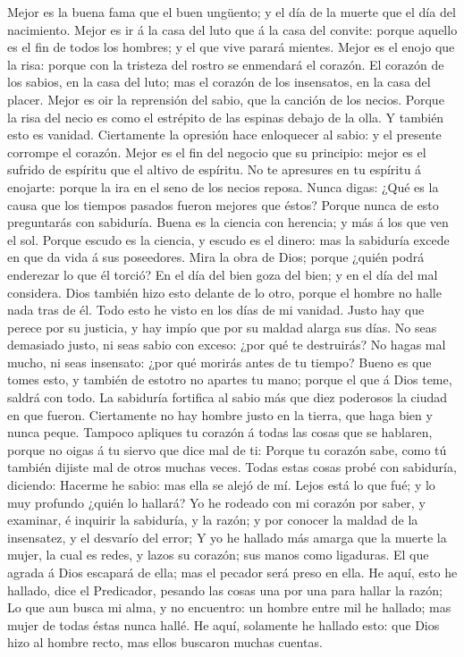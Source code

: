  Mejor es la buena fama que el buen ungüento; y el día de la
muerte que el día del nacimiento.  Mejor es ir á la casa del
luto que á la casa del convite: porque aquello es el fin de todos los
hombres; y el que vive parará mientes.  Mejor es el enojo
que la risa: porque con la tristeza del rostro se enmendará el corazón.
 El corazón de los sabios, en la casa del luto; mas el
corazón de los insensatos, en la casa del placer.  Mejor es
oir la reprensión del sabio, que la canción de los necios. 
Porque la risa del necio es como el estrépito de las espinas debajo de
la olla. Y también esto es vanidad.  Ciertamente la opresión
hace enloquecer al sabio: y el presente corrompe el corazón.
 Mejor es el fin del negocio que su principio: mejor es el
sufrido de espíritu que el altivo de espíritu.  No te
apresures en tu espíritu á enojarte: porque la ira en el seno de los
necios reposa.  Nunca digas: ¿Qué es la causa que los
tiempos pasados fueron mejores que éstos? Porque nunca de esto
preguntarás con sabiduría.  Buena es la ciencia con
herencia; y más á los que ven el sol.  Porque escudo es la
ciencia, y escudo es el dinero: mas la sabiduría excede en que da vida á
sus poseedores.  Mira la obra de Dios; porque ¿quién podrá
enderezar lo que él torció?  En el día del bien goza del
bien; y en el día del mal considera. Dios también hizo esto delante de
lo otro, porque el hombre no halle nada tras de él.  Todo
esto he visto en los días de mi vanidad. Justo hay que perece por su
justicia, y hay impío que por su maldad alarga sus días. 
No seas demasiado justo, ni seas sabio con exceso: ¿por qué te
destruirás?  No hagas mal mucho, ni seas insensato: ¿por
qué morirás antes de tu tiempo?  Bueno es que tomes esto, y
también de estotro no apartes tu mano; porque el que á Dios teme, saldrá
con todo.  La sabiduría fortifica al sabio más que diez
poderosos la ciudad en que fueron.  Ciertamente no hay
hombre justo en la tierra, que haga bien y nunca peque. 
Tampoco apliques tu corazón á todas las cosas que se hablaren, porque no
oigas á tu siervo que dice mal de ti:  Porque tu corazón
sabe, como tú también dijiste mal de otros muchas veces. 
Todas estas cosas probé con sabiduría, diciendo: Hacerme he sabio: mas
ella se alejó de mí.  Lejos está lo que fué; y lo muy
profundo ¿quién lo hallará?  Yo he rodeado con mi corazón
por saber, y examinar, é inquirir la sabiduría, y la razón; y por
conocer la maldad de la insensatez, y el desvarío del error;
 Y yo he hallado más amarga que la muerte la mujer, la cual
es redes, y lazos su corazón; sus manos como ligaduras. El que agrada á
Dios escapará de ella; mas el pecador será preso en ella. 
He aquí, esto he hallado, dice el Predicador, pesando las cosas una por
una para hallar la razón;  Lo que aun busca mi alma, y no
encuentro: un hombre entre mil he hallado; mas mujer de todas éstas
nunca hallé.  He aquí, solamente he hallado esto: que Dios
hizo al hombre recto, mas ellos buscaron muchas cuentas.

